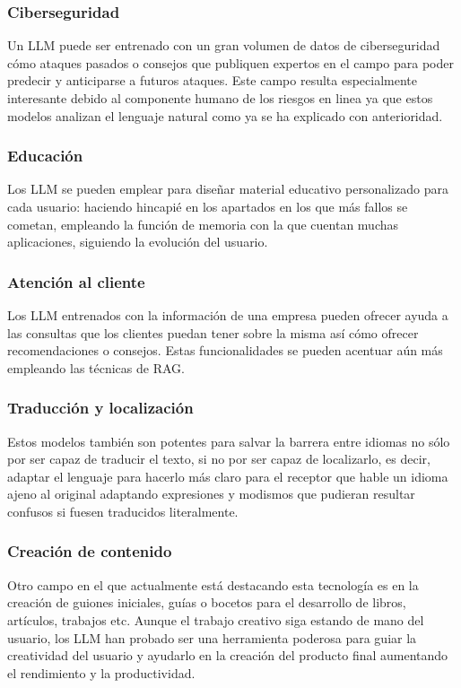 \subsubsection{Ciberseguridad}

Un LLM puede ser entrenado con un gran volumen de datos de ciberseguridad cómo ataques pasados o consejos que publiquen expertos en el campo para poder predecir y anticiparse a futuros ataques. Este campo resulta especialmente interesante debido al componente humano de los riesgos en linea ya que estos modelos analizan el lenguaje natural como ya se ha explicado con anterioridad. 
\subsubsection{Educación}

Los LLM se pueden emplear para diseñar material educativo personalizado para cada usuario: haciendo hincapié en los apartados en los que más fallos se cometan, empleando la función de memoria con la que cuentan muchas aplicaciones, siguiendo la evolución del usuario.
\subsubsection{Atención al cliente}

Los LLM entrenados con la información de una empresa pueden ofrecer ayuda a las consultas que los clientes puedan tener sobre la misma así cómo ofrecer recomendaciones o consejos. Estas funcionalidades se pueden acentuar aún más empleando las técnicas de RAG.
\subsubsection{Traducción y localización}

Estos modelos también son potentes para salvar la barrera entre idiomas no sólo por ser capaz de traducir el texto, si no por ser capaz de localizarlo, es decir, adaptar el lenguaje para hacerlo más claro para el receptor que hable un idioma ajeno al original adaptando expresiones y modismos que pudieran resultar confusos si fuesen traducidos literalmente.
\subsubsection{Creación de contenido}

Otro campo en el que actualmente está destacando esta tecnología es en la creación de guiones iniciales, guías o bocetos para el desarrollo de libros, artículos, trabajos etc. Aunque el trabajo creativo siga estando de mano del usuario, los LLM han probado ser una herramienta poderosa para guiar la creatividad del usuario y ayudarlo en la creación del producto final aumentando el rendimiento y la productividad.
